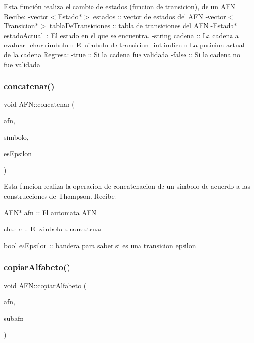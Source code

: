 Esta función realiza el cambio de estados (funcion de transicion), de un \hyperlink{class_a_f_n}{A\+FN} Recibe\+: -\/vector$<$Estado$\ast$$>$ estados \+:\+: vector de estados del \hyperlink{class_a_f_n}{A\+FN} -\/vector$<$Transicion$\ast$$>$ tabla\+De\+Transiciones \+:\+: tabla de transiciones del \hyperlink{class_a_f_n}{A\+FN} -\/\+Estado$\ast$ estado\+Actual \+:\+: El estado en el que se encuentra. -\/string cadena \+:\+: La cadena a evaluar -\/char simbolo \+:\+: El simbolo de transicion -\/int indice \+:\+: La posicion actual de la cadena Regresa\+: -\/true \+:\+: Si la cadena fue validada -\/false \+:\+: Si la cadena no fue validada \mbox{\label{class_a_f_n_a5247562556a165a9eae8524143ace7db}} 
\subsubsection{\texorpdfstring{concatenar()}{concatenar()}}
{\footnotesize\ttfamily void A\+F\+N\+::concatenar (\begin{DoxyParamCaption}\item[{\hyperlink{class_a_f_n}{A\+FN} $\ast$}]{afn,  }\item[{char}]{simbolo,  }\item[{bool}]{es\+Epsilon }\end{DoxyParamCaption})}

Esta funcion realiza la operacion de concatenacion de un simbolo de acuerdo a las construcciones de Thompson. Recibe\+:
\begin{DoxyItemize}
\item A\+F\+N$\ast$ afn \+:\+: El automata \hyperlink{class_a_f_n}{A\+FN}
\item char c \+:\+: El simbolo a concatenar
\item bool es\+Epsilon \+:\+: bandera para saber si es una transicion epsilon 
\end{DoxyItemize}\mbox{\label{class_a_f_n_a1c17f6a2dd580162303127bfbdac2d4b}} 
\subsubsection{\texorpdfstring{copiar\+Alfabeto()}{copiarAlfabeto()}}
{\footnotesize\ttfamily void A\+F\+N\+::copiar\+Alfabeto (\begin{DoxyParamCaption}\item[{\hyperlink{class_a_f_n}{A\+FN} $\ast$}]{afn,  }\item[{\hyperlink{class_a_f_n}{A\+FN}}]{subafn }\end{DoxyParamCaption})}

